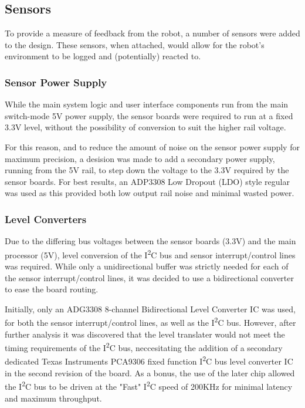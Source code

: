 
\subsection{Sensors}

To provide a measure of feedback from the robot, a number of sensors were added to the design. These sensors, when attached, would allow for the robot's environment to be logged and (potentially) reacted to.

\subsubsection{Sensor Power Supply}

While the main system logic and user interface components run from the main switch-mode 5V power supply, the sensor boards were required to run at a fixed 3.3V level, without the possibility of conversion to suit the higher rail voltage.

For this reason, and to reduce the amount of noise on the sensor power supply for maximum precision, a desision was made to add a secondary power supply, running from the 5V rail, to step down the voltage to the 3.3V required by the sensor boards. For best results, an ADP3308 Low Dropout (LDO) style regular was used as this provided both low output rail noise and minimal wasted power.

\subsubsection{Level Converters}

Due to the differing bus voltages between the sensor boards (3.3V) and the main processor (5V), level conversion of the I\textsuperscript{2}C bus and sensor interrupt/control lines was required. While only a unidirectional buffer was strictly needed for each of the sensor interrupt/control lines, it was decided to use a bidirectional converter to ease the board routing.

Initially, only an ADG3308 8-channel Bidirectional Level Converter IC was used, for both the sensor interrupt/control lines, as well as the I\textsuperscript{2}C bus. However, after further analysis it was discovered that the level translater would not meet the timing requirements of the I\textsuperscript{2}C bus, neccesitating the addition of a secondary dedicated Texas Instruments PCA9306 fixed function I\textsuperscript{2}C bus level converter IC in the second revision of the board. As a bonus, the use of the later chip allowed the I\textsuperscript{2}C bus to be driven at the "Fast" I\textsuperscript{2}C speed of 200KHz for minimal latency and maximum throughput.

